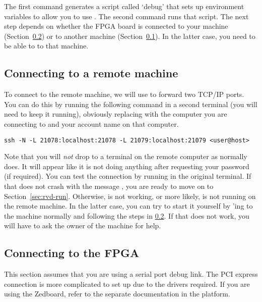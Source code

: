 \noindent The first command generates a script called `debug' that sets up 
environment variables to allow you to use . The second command runs 
that script. The next step depends on whether the FPGA board is connected to 
your machine (Section~\ref{sec:rvd-start-local}) or to another machine 
(Section~\ref{sec:rvd-start-remote}). In the latter case, you need to be able to 
 to that machine.

\subsection{Connecting to a remote machine}
\label{sec:rvd-start-remote}

To connect to the remote machine, we will use  to forward two TCP/IP 
ports. You can do this by running the following command in a second terminal 
(you will need to keep it running), obviously replacing  with 
the computer you are connecting to and your account name on that computer.

\begin{lstlisting}[numbers=none, language=nothing]
ssh -N -L 21078:localhost:21078 -L 21079:localhost:21079 <user@host>
\end{lstlisting}

\noindent Note that you will \emph{not} drop to a terminal on the remote 
computer as  normally does. It will appear like it is not doing 
anything after requesting your password (if required). You can test the 
connection by running  in the original terminal. If that does not 
crash with the message , you are ready to move 
on to Section~\ref{sec:rvd-run}. Otherwise,  is not working, or more 
likely,  is not running on the remote machine. In the latter case, 
you can try to start it yourself by 'ing to the machine normally and 
following the steps in \ref{sec:rvd-start-local}. If that does not work, you 
will have to ask the owner of the machine for help.

\subsection{Connecting to the FPGA}
\label{sec:rvd-start-local}

This section assumes that you are using a serial port debug link. The PCI
express connection is more complicated to set up due to the drivers required.
If you are using the Zedboard, refer to the separate documentation in the
 platform.

